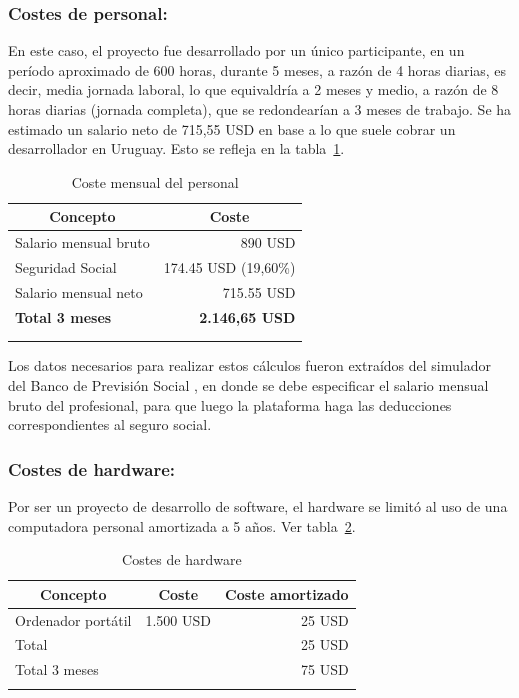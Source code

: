 \subsubsection{Costes de personal:}
En este caso, el proyecto fue desarrollado por un único participante, en un período aproximado de 600 horas, durante 5 meses, a razón de 4 horas diarias, es decir, media jornada laboral, lo que equivaldría a 2 meses y medio, a razón de 8 horas diarias (jornada completa), que se redondearían a 3 meses de trabajo. Se ha estimado un salario neto de 715,55 USD en base a lo que suele cobrar un desarrollador en Uruguay. Esto se refleja en la tabla~\ref{tab:CostePersonal}.

\begin{longtable}[c]{@{}lr@{}}
\toprule
\multicolumn{1}{c}{\textbf{Concepto}} & \multicolumn{1}{c}{\textbf{Coste}} \\* \midrule
\endfirsthead
%
\endhead
%
\bottomrule
\endfoot
%
\endlastfoot
%
Salario mensual bruto & 890 USD \\
Seguridad Social & 174.45 USD (19,60\%) \\
Salario mensual neto & 715.55 USD \\
\hline
\textbf{Total 3 meses} & \textbf{2.146,65 USD} \\* \bottomrule \\
\caption{Coste mensual del personal}
\label{tab:CostePersonal}
\end{longtable}


Los datos necesarios para realizar estos cálculos fueron extraídos del simulador del Banco de Previsión Social \cite{web:bps}, en donde se debe especificar el salario mensual bruto del profesional, para que luego la plataforma haga las deducciones correspondientes al seguro social.

\subsubsection{Costes de hardware:}
Por ser un proyecto de desarrollo de software, el hardware se limitó al uso de una computadora personal amortizada a 5 años. Ver tabla~\ref{tab:CostesHardware}.

\begin{longtable}[c]{@{}lrr@{}}
\toprule
\multicolumn{1}{c}{\textbf{Concepto}} & \multicolumn{1}{c}{\textbf{Coste}} & \multicolumn{1}{c}{\textbf{Coste amortizado}} \\* \midrule
\endfirsthead
%
\endhead
%
\bottomrule
\endfoot
%
\endlastfoot
%
Ordenador portátil & 1.500 USD & 25 USD \\
Total & & 25 USD \\
Total 3 meses & & 75 USD \\ \hline
\caption{Costes de hardware}
\label{tab:CostesHardware}
\end{longtable}

